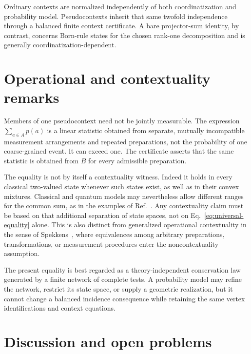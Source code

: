 \documentclass[
  twocolumn,
  aps,
  pra,
  floatfix,
  amsmath,amssymb,
  longbibliography
]{revtex4-2}
\theoremstyle{definition}
\theoremstyle{remark}
\begin{document}
Ordinary contexts are normalized independently of both coordinatization and
probability model.  Pseudocontexts inherit that same twofold independence
through a balanced finite context certificate.  A bare projector-sum identity,
by contrast, concerns Born-rule states for the chosen rank-one decomposition
and is generally coordinatization-dependent.

\section{Operational and contextuality remarks}
\label{sec:operational}

Members of one pseudocontext need not be jointly measurable.  The expression
$\sum_{a\in A}p(a)$ is a linear statistic obtained from separate, mutually
incompatible measurement arrangements and repeated preparations, not the
probability of one coarse-grained event.  It can exceed one.  The certificate asserts that
the same statistic is obtained from $B$ for every admissible preparation.

The equality is not by itself a contextuality witness.  Indeed it holds in
every classical two-valued state whenever such states exist, as well as in
their convex mixtures.  Classical and quantum models may nevertheless allow
different ranges for the common sum, as in the examples of
Ref.~\cite{2023-navara-svozil}.  Any contextuality claim must be based on that
additional separation of state spaces, not on Eq.~\eqref{eq:universal-equality}
alone.  This is also distinct from generalized operational contextuality in
the sense of Spekkens~\cite{Spekkens-04}, where equivalences among arbitrary
preparations, transformations, or measurement procedures enter the
noncontextuality assumption.

The present equality is best regarded as a theory-independent conservation
law generated by a finite network of complete tests.  A probability model
may refine the network, restrict its state space, or supply a geometric
realization, but it cannot change a balanced incidence consequence while
retaining the same vertex identifications and context equations.

\section{Discussion and open problems}
\end{document}
